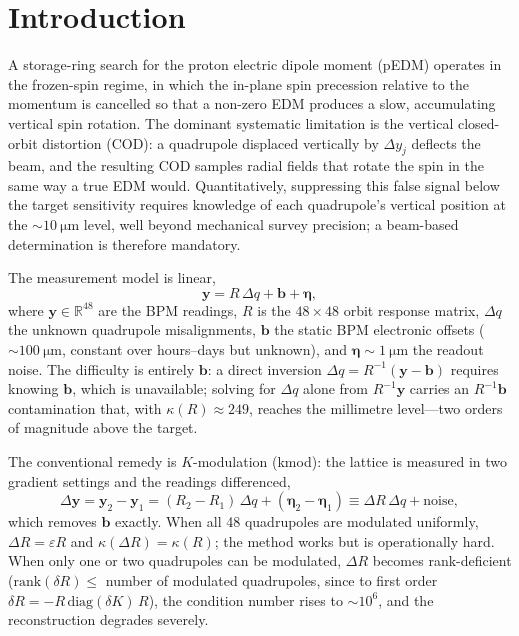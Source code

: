 \documentclass[preprint,12pt]{elsarticle}
\begin{document}
\section{Introduction}
\label{sec:intro}

A storage-ring search for the proton electric dipole moment (pEDM)
operates in the frozen-spin regime, in which the in-plane spin precession
relative to the momentum is cancelled so that a non-zero EDM produces a
slow, accumulating vertical spin rotation. The dominant systematic
limitation is the vertical closed-orbit distortion (COD): a quadrupole
displaced vertically by $\Delta y_j$ deflects the beam, and the resulting
COD samples radial fields that rotate the spin in the same way a true EDM
would. Quantitatively, suppressing this false signal below the target
sensitivity requires knowledge of each quadrupole's vertical position at
the $\sim\SI{10}{\micro\meter}$ level, well beyond mechanical survey
precision; a beam-based determination is therefore mandatory.

The measurement model is linear,
\begin{equation}
\mathbf{y} = R\,\Delta q + \mathbf{b} + \boldsymbol{\eta},
\label{eq:model}
\end{equation}
where $\mathbf{y}\in\mathbb{R}^{48}$ are the BPM readings, $R$ is the
$48\times48$ orbit response matrix, $\Delta q$ the unknown quadrupole
misalignments, $\mathbf{b}$ the static BPM electronic offsets
($\sim\SI{100}{\micro\meter}$, constant over hours--days but unknown), and
$\boldsymbol{\eta}\sim\SI{1}{\micro\meter}$ the readout noise. The
difficulty is entirely $\mathbf{b}$: a direct inversion
$\Delta q = R^{-1}(\mathbf{y}-\mathbf{b})$ requires knowing $\mathbf{b}$,
which is unavailable; solving for $\Delta q$ alone from $R^{-1}\mathbf{y}$
carries an $R^{-1}\mathbf{b}$ contamination that, with $\kappa(R)\approx249$,
reaches the millimetre level---two orders of magnitude above the target.

The conventional remedy is $K$-modulation (kmod): the lattice is measured
in two gradient settings and the readings differenced,
\begin{equation}
\Delta\mathbf{y} = \mathbf{y}_2-\mathbf{y}_1
= (R_2-R_1)\,\Delta q + (\boldsymbol{\eta}_2-\boldsymbol{\eta}_1)
\equiv \Delta R\,\Delta q + \text{noise},
\end{equation}
which removes $\mathbf{b}$ exactly. When all 48 quadrupoles are modulated
uniformly, $\Delta R=\varepsilon R$ and $\kappa(\Delta R)=\kappa(R)$;
the method works but is operationally hard. When only one or two
quadrupoles can be modulated, $\Delta R$ becomes rank-deficient
($\mathrm{rank}(\delta R)\le$ number of modulated quadrupoles, since to
first order $\delta R = -R\,\mathrm{diag}(\delta K)\,R$), the condition
number rises to $\sim10^6$, and the reconstruction degrades severely.
\end{document}
